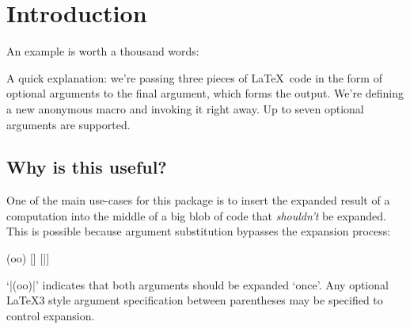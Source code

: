 \documentclass[a4paper]{withargs-packagedoc}
\begin{document}

\maketitle

\section{Introduction}                                                         %

An example is worth a thousand words:

\begin{latex-example-show}
\end{latex-example-show}

A quick explanation: we're passing three pieces of \LaTeX\ code in the form
of optional arguments to the final argument, which forms the output. We're
defining a new anonymous macro and invoking it right away.
Up to seven optional arguments are supported.



\subsection{Why is this useful?} %

One of the main use-cases for this package is to insert the expanded
result of a computation into the middle of a big
blob of code that \emph{shouldn't} be expanded. This is possible because
argument substitution bypasses the expansion process:

\begin{latex-example-show}
\def \expectedResult {\bar}
\def \actualResult   {\bas}
\withargs (oo) [\actualResult] [\expectedResult] {
    \texttt{}
}
\end{latex-example-show}

`|(oo)|' indicates that both arguments should be expanded `once'.
Any optional \LaTeX3 style argument specification between parentheses
may be specified to control expansion.
\end{document}
